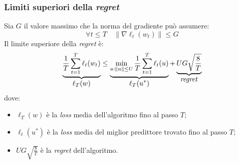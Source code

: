 \subsubsection{Limiti superiori della \textit{regret}}
Sia $G$ il valore massimo che la norma del gradiente può assumere:
$$ \forall t\leq T \quad \| \nabla\ell_t(w_t)\|\leq G  $$
Il limite superiore della \textit{regret} è:
$$
\underbrace{\frac{1}{T}\sum_{t=1}^{T}\ell_t(w_t)}_{\displaystyle\ell_T(w)}\leq
\underbrace{\min_{u:\|u\|\leq U} \frac{1}{T}\sum_{t=1}^T \ell_t(u)}_
    {\displaystyle\ell_T(u^*)}
+\underbrace{UG\sqrt{\frac{8}{T}}}_{\displaystyle\text{\textit{regret}}}
$$
dove:
\begin{itemize}
    \item $\ell_T(w)$ è la \textit{loss} media dell'algoritmo fino al passo $T$;
    \item $\ell_t(u^*)$ è la \textit{loss} media del miglior predittore trovato
        fino al passo $T$;
    \item $UG\sqrt{\frac{8}{T}}$ è la \textit{regret} dell'algoritmo.
\end{itemize}
